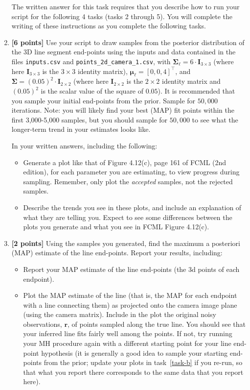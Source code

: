 \documentclass[10pt]{article}
\begin{document}
\begin{enumerate}
The written answer for this task requires that you describe how to run your script for the following 4 tasks (tasks 2 through 5). You will complete the writing of these instructions as you complete the following tasks.

\item {\bf [6 points]} \label{task-b} Use your script to draw samples from the posterior distribution of the 3D line segment end-points using the inputs and data contained in the files {\tt inputs.csv} and {\tt points\_2d\_camera\_1.csv}, with $\boldsymbol{\Sigma}_{\boldsymbol{\ell}} = 6 \cdot \mathbf{I}_{3 \times 3}$ (where here $\mathbf{I}_{3 \times 3}$ is the $3 \times 3$ identity matrix), $\boldsymbol{\mu}_{\boldsymbol{\ell}} = [0,0,4]^{\top}$, and $\boldsymbol{\Sigma} = (0.05)^2 \cdot \mathbf{I}_{2 \times 2}$ (where here $\mathbf{I}_{2 \times 2}$ is the $2 \times 2$ identity matrix and $(0.05)^2$ is the scalar value of the square of $0.05$).  It is recommended that you sample your initial end-points from the prior.  Sample for $50,000$ iterations.  Note: you will likely find your best (MAP) fit points within the first 3,000-5,000 samples, but you should sample for $50,000$ to see what the longer-term trend in your estimates looks like.

In your written answers, including the following: 
\begin{itemize}
\item Generate a plot like that of Figure 4.12(c), page 161 of FCML (2nd edition), for each parameter you are estimating, to view progress during sampling.  Remember, only plot the {\em accepted} samples, not the rejected samples.
\item Describe the trends you see in these plots, and include an explanation of what they are telling you.  Expect to see some differences between the plots you generate and what you see in FCML Figure 4.12(c).
\end{itemize}

\item {\bf [2 points]} \label{task-c} Using the samples you generated, find the maximum a posteriori (MAP) estimate of the line end-points.
Report your results, including: 
\begin{itemize}
\item Report your MAP estimate of the line end-points (the 3d points of each endpoint).
\item Plot the MAP estimate of the line (that is, the MAP for each endpoint with a line connecting them) as projected onto the camera image plane (using the camera matrix).  Include in the plot the original noisy observations, $\mathbf{r}$, of points sampled along the true line.  You should see that your inferred line fits fairly well among the points.  If not, try running your MH procedure again with a different starting point for your line end-point hypothesis (it is generally a good idea to sample your starting end-points from the prior; update your plots in task~\ref{task-b} if you re-run, so that what you report there corresponds to the same data that you report here).
\end{itemize}


\end{enumerate}
\end{document}
